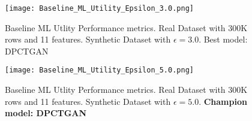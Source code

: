 \documentclass[10pt,twocolumn,letterpaper]{article}
\begin{document}
\begin{itemize}
    \begin{figure}[ht]
    \begin{center}
       \texttt{[image: Baseline\_ML\_Utility\_Epsilon\_3.0.png]}
    \end{center}
       \caption{Baseline ML Utlity Performance metrics. Real Dataset with 300K rows and 11 features. Synthetic Dataset with $\epsilon=3.0$. Best model: DPCTGAN}
    \label{fig:long}
    \label{fig:onecol}
    \end{figure}

    \begin{figure}[ht]
    \begin{center}
       \texttt{[image: Baseline\_ML\_Utility\_Epsilon\_5.0.png]}
    \end{center}
       \caption{Baseline ML Utlity Performance metrics. Real Dataset with 300K rows and 11 features. Synthetic Dataset with $\epsilon=5.0$. \textbf{Champion model: DPCTGAN}}
    \label{fig:long}
    \label{fig:onecol}
    \end{figure}
\end{itemize}
\end{document}
